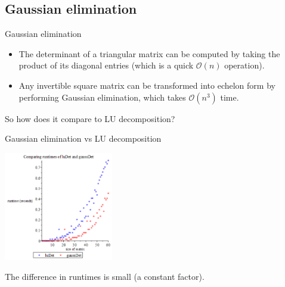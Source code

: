 \documentclass{beamer}
\begin{document}
\subsection{Gaussian elimination}

\begin{frame}{Gaussian elimination}

    \begin{itemize}

        \item The determinant of a triangular matrix can be computed by taking the product of its
            diagonal entries (which is a quick $\mathcal{O}(n)$ operation).

        \item Any invertible square matrix can be transformed into echelon form by performing
            Gaussian elimination, which takes $\mathcal{O}(n^3)$ time.

    \end{itemize}

    So how does it compare to LU decomposition?

\end{frame}

\begin{frame}{Gaussian elimination vs LU decomposition}

    \begin{center}{}
        \includegraphics[height=180]{lu-gauss}
    \end{center}

    The difference in runtimes is small (a constant factor).

\end{frame}
\end{document}
